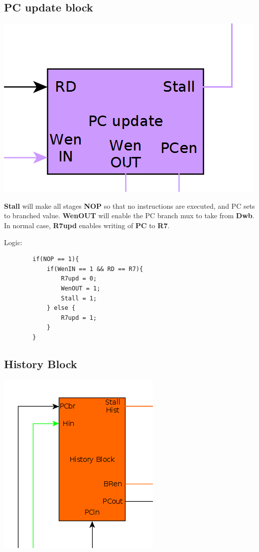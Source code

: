 \documentclass{article}
\begin{document}
\subsection*{PC update block}

\includegraphics[scale=0.5]{pc}

\textbf{Stall} will make all stages \textbf{NOP} so that no instructions are executed,
and PC sets to branched value.
\textbf{WenOUT} will enable the PC branch mux to take from \textbf{Dwb}.
In normal case, \textbf{R7upd} enables writing of \textbf{PC} to \textbf{R7}.

Logic:
    \begin{lstlisting}
        if(NOP == 1){
            if(WenIN == 1 && RD == R7){
                R7upd = 0;
                WenOUT = 1;
                Stall = 1;
            } else {
                R7upd = 1;
            }
        }
    \end{lstlisting}


\subsection*{History Block}

\includegraphics[scale=0.5]{history_block}
\end{document}
